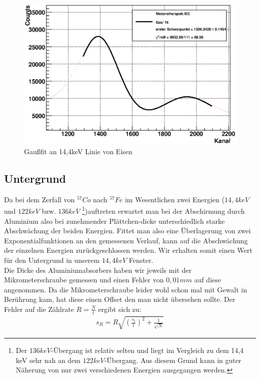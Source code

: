 \documentclass[12pt]{article}
\begin{document}
\begin{figure}[H]
 \includegraphics[width=0.9\linewidth]{pictures/eichung_spek.eps}
 \caption{Gaußfit an 14,4keV Linie von Eisen}
\label{spek}
\end{figure}

\subsection{Untergrund}
Da bei dem Zerfall von $^{57}Co$ nach $^{57}Fe$ im Wesentlichen zwei Energien ($14,4 keV$ und $122 keV$ bzw. $136 keV$
\footnote{Der $136 keV$-Übergang ist relativ selten und liegt im Vergleich zu dem 14,4 keV sehr nah an dem $122 keV$-Übergang. Aus diesem Grund kann in guter
Näherung von nur zwei verschiedenen Energien ausgegangen werden.})auftreten erwartet man bei der Abschirmung durch Aluminium also bei zunehmender Plättchen-dicke
unterschiedlich starke Abschwächung der beiden Energien. Fittet man also eine Überlagerung von zwei Exponentialfunktionen an den gemessenen Verlauf, kann auf
die Abschwächung der einzelnen Energien zurückgeschlossen werden. Wir erhalten somit einen Wert für den Untergrund in unserem $14,4 keV$ Fenster.\\

Die Dicke des Aluminiumabsorbers haben wir jeweils mit der Mikrometerschraube gemessen und einen Fehler von $0,01 mm$ auf diese angenommen. Da die Mikrometerschraube leider wohl schon mal mit Gewalt in Berührung kam, hat diese einen Offset den man nicht übersehen sollte.
Der Fehler auf die Zählrate $R = \frac{N}{t}$ ergibt sich zu:
\begin{align}
 s_R = R \sqrt{\left(\frac{s_t}{t}\right)^2 + \frac{1}{\sqrt{N}}}
\end{align}
\end{document}
